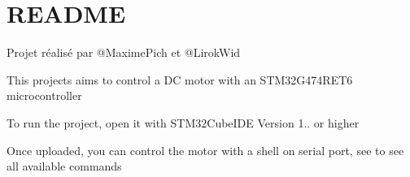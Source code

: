 \chapter{README}
\hypertarget{md__r_e_a_d_m_e}{}\label{md__r_e_a_d_m_e}
Projet réalisé par @\+Maxime\+Pich et @\+Lirok\+Wid

This projects aims to control a DC motor with an STM32\+G474\+RET6 microcontroller

To run the project, open it with STM32\+Cube\+IDE Version 1.. or higher

Once uploaded, you can control the motor with a shell on serial port, see  to see all available commands 